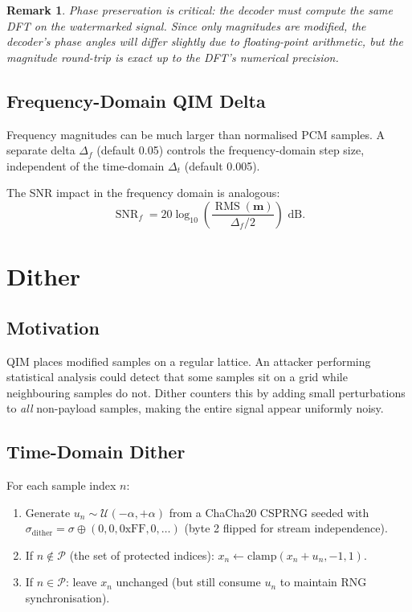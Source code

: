 \documentclass[11pt,a4paper]{article}
\newtheorem{remark}[theorem]{Remark}
\newcommand{\xor}{\oplus}
\DeclareMathOperator{\rms}{RMS}
\DeclareMathOperator{\snr}{SNR}
\begin{document}
\begin{remark}
Phase preservation is critical: the decoder must compute the \emph{same}
DFT on the watermarked signal.  Since only magnitudes are modified, the
decoder's phase angles will differ slightly due to floating-point arithmetic,
but the magnitude round-trip is exact up to the DFT's numerical precision.
\end{remark}

\subsection{Frequency-Domain QIM Delta}

Frequency magnitudes can be much larger than normalised PCM samples.
A separate delta $\Delta_f$ (default 0.05) controls the frequency-domain
step size, independent of the time-domain $\Delta_t$ (default 0.005).

The SNR impact in the frequency domain is analogous:
\[
    \snr_f = 20 \log_{10}\!\left(\frac{\rms(\mathbf{m})}{\Delta_f / 2}\right) \text{ dB}.
\]


\section{Dither}
\label{sec:dither}

\subsection{Motivation}

QIM places modified samples on a regular lattice.  An attacker performing
statistical analysis could detect that some samples sit on a grid while
neighbouring samples do not.  Dither counters this by adding small
perturbations to \emph{all} non-payload samples, making the entire
signal appear uniformly noisy.

\subsection{Time-Domain Dither}

For each sample index $n$:
\begin{enumerate}
    \item Generate $u_n \sim \mathcal{U}(-\alpha, +\alpha)$ from a ChaCha20 CSPRNG
          seeded with $\sigma_\text{dither} = \sigma \xor (0, 0, \text{0xFF}, 0, \ldots)$
          (byte 2 flipped for stream independence).
    \item If $n \notin \mathcal{P}$ (the set of protected indices):
          $x_n \leftarrow \mathrm{clamp}(x_n + u_n, -1, 1)$.
    \item If $n \in \mathcal{P}$: leave $x_n$ unchanged (but still
          consume $u_n$ to maintain RNG synchronisation).
\end{enumerate}
\end{document}
